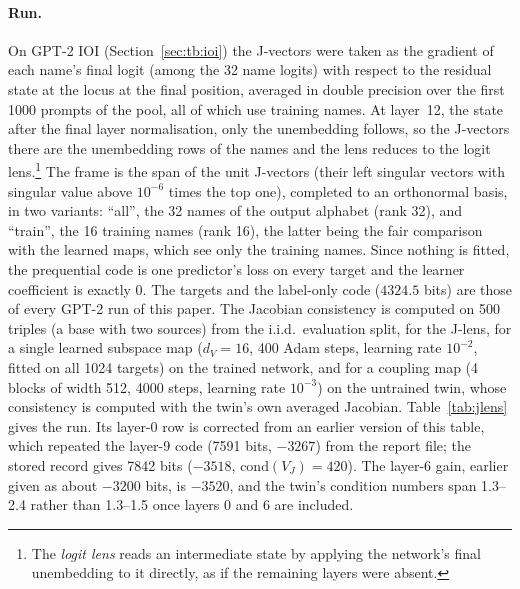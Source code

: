 \documentclass[11pt,a4paper]{article}
\newcommand{\dv}{d_V}
\begin{document}
\paragraph{Run.} On GPT-2 IOI (Section~\ref{sec:tb:ioi}) the J-vectors were taken as the gradient of each name's final logit (among the 32 name logits) with respect to the residual state at the locus at the final position, averaged in double precision over the first 1000 prompts of the pool, all of which use training names. At layer~12, the state after the final layer normalisation, only the unembedding follows, so the J-vectors there are the unembedding rows of the names and the lens reduces to the logit lens.\footnote{The \emph{logit lens} reads an intermediate state by applying the network's final unembedding to it directly, as if the remaining layers were absent.} The frame is the span of the unit J-vectors (their left singular vectors with singular value above $10^{-6}$ times the top one), completed to an orthonormal basis, in two variants: ``all'', the 32 names of the output alphabet (rank 32), and ``train'', the 16 training names (rank 16), the latter being the fair comparison with the learned maps, which see only the training names. Since nothing is fitted, the prequential code is one predictor's loss on every target and the learner coefficient is exactly 0. The targets and the label-only code ($4324.5$ bits) are those of every GPT-2 run of this paper. The Jacobian consistency is computed on 500 triples (a base with two sources) from the i.i.d.\ evaluation split, for the J-lens, for a single learned subspace map ($\dv=16$, 400 Adam steps, learning rate $10^{-2}$, fitted on all 1024 targets) on the trained network, and for a coupling map (4 blocks of width 512, 4000 steps, learning rate $10^{-3}$) on the untrained twin, whose consistency is computed with the twin's own averaged Jacobian. Table~\ref{tab:jlens} gives the run. Its layer-0 row is corrected from an earlier version of this table, which repeated the layer-9 code (7591 bits, $-3267$) from the report file; the stored record gives 7842 bits ($-3518$, $\mathrm{cond}(V_J)=420$). The layer-6 gain, earlier given as about $-3200$ bits, is $-3520$, and the twin's condition numbers span 1.3--2.4 rather than 1.3--1.5 once layers 0 and 6 are included.
\end{document}
